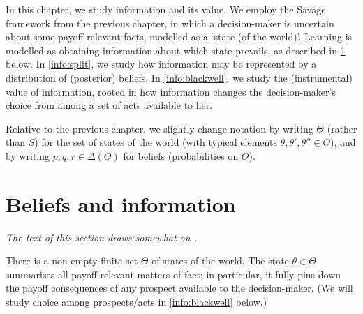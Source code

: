 




In this chapter, we study information and its value. We employ the Savage framework from the previous chapter, in which a decision-maker is uncertain about some payoff-relevant facts, modelled as a `state (of the world)'. Learning is modelled as obtaining information about which state prevails, as described in \cref{info:info} below. In \cref{info:split}, we study how information may be represented by a distribution of (posterior) beliefs. In \cref{info:blackwell}, we study the (instrumental) value of information, rooted in how information changes the decision-maker's choice from among a set of acts available to her.

Relative to the previous chapter, we slightly change notation by writing $\Theta$ (rather than $S$) for the set of states of the world (with typical elements $\theta,\theta',\theta'' \in \Theta$), and by writing $p,q,r \in \Delta(\Theta)$ for beliefs (probabilities on $\Theta$).



\section{Beliefs and information}
\label{info:info}

\emph{The text of this section draws somewhat on \textcite{disc}.}

There is a non-empty finite set $\Theta$ of states of the world. The state $\theta \in \Theta$ summarises all payoff-relevant matters of fact; in particular, it fully pins down the payoff consequences of any prospect available to the decision-maker. (We will study choice among prospects/acts in \cref{info:blackwell} below.)

